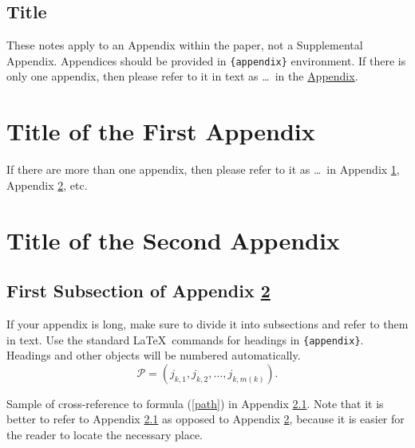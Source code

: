 \documentclass[ecta,nameyear,draft]{econsocart}
\theoremstyle{plain}
\theoremstyle{definition}
\begin{document}
\begin{appendix}
\section*{Title}\label{appn} %
These notes apply to an Appendix within the paper, not a Supplemental Appendix. Appendices should be provided in \verb|{appendix}| environment. If there is only one appendix,
then please refer to it in text as \ldots\ in the \hyperref[appn]{Appendix}.
\end{appendix}

\begin{appendix}
\section{Title of the First Appendix}\label{appA}
If there are more than one appendix, then please refer to it
as \ldots\ in Appendix \ref{appA}, Appendix \ref{appB}, etc.

\section{Title of the Second Appendix}\label{appB}
\subsection{First Subsection of Appendix \protect\ref{appB}}\label{appB1}

If your appendix is long, make sure to divide it into subsections and refer to them in text. Use the standard \LaTeX\ commands for headings in \verb|{appendix}|.
Headings and other objects will be numbered automatically.
\begin{equation}
\mathcal{P}=(j_{k,1},j_{k,2},\dots,j_{k,m(k)}). \label{path}
\end{equation}

Sample of cross-reference to formula (\ref{path}) in Appendix \ref{appB1}.
Note that it is better to refer to Appendix \ref{appB1} as opposed to Appendix \ref{appB}, because it is easier for the reader to locate the necessary place. \end{appendix}
\end{document}
